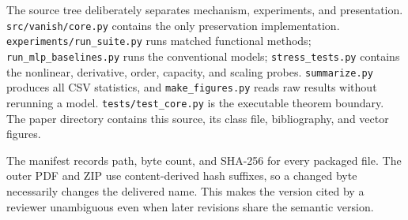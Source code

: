 \documentclass{vanish_ieee}
\theoremstyle{definition}
\begin{document}
The source tree deliberately separates mechanism, experiments, and presentation.  \texttt{src/vanish/core.py} contains the only preservation implementation.  \texttt{experiments/run\_suite.py} runs matched functional methods; \texttt{run\_mlp\_baselines.py} runs the conventional models; \texttt{stress\_tests.py} contains the nonlinear, derivative, order, capacity, and scaling probes.  \texttt{summarize.py} produces all CSV statistics, and \texttt{make\_figures.py} reads raw results without rerunning a model.  \texttt{tests/test\_core.py} is the executable theorem boundary.  The paper directory contains this source, its class file, bibliography, and vector figures.

The manifest records path, byte count, and SHA-256 for every packaged file.  The outer PDF and ZIP use content-derived hash suffixes, so a changed byte necessarily changes the delivered name.  This makes the version cited by a reviewer unambiguous even when later revisions share the semantic version.



\balance
\end{document}
